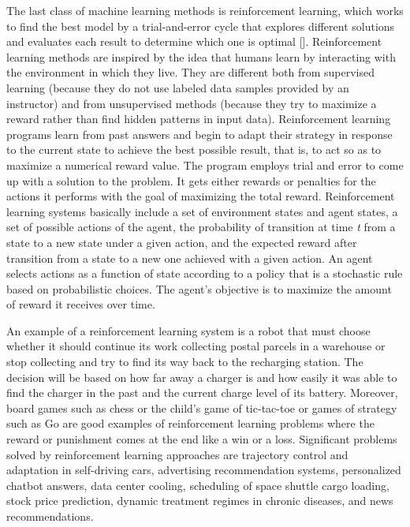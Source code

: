 The last class of machine learning methods is reinforcement learning, which works to find the best model by a trial-and-error cycle that explores different solutions and evaluates each result to determine which one is optimal [\citealt{chap:4:BartoandSutton:2014}]. Reinforcement learning methods are inspired by the idea that humans learn by interacting with the environment in which they live. They are different both from supervised learning (because they do not use labeled data samples provided by an instructor) and from unsupervised methods (because they try to maximize a reward rather than find hidden patterns in input data). Reinforcement learning programs learn from past answers and begin to adapt their strategy in response to the current state to achieve the best possible result, that is, to act so as to maximize a numerical reward value. The program employs trial and error to come up with a solution to the problem. It gets either rewards or penalties for the actions it performs with the goal of maximizing the total reward. Reinforcement learning systems basically include a set of environment states and agent states, a set of possible actions of the agent, the probability of transition at time \textit{t} from a state to a new state under a given action, and the expected reward after transition from a state to a new one achieved with a given action. An agent selects actions as a function of state according to a policy that is a stochastic rule based on probabilistic choices. The agent's objective is to maximize the amount of reward it receives over time.

An example of a reinforcement learning system is a robot that must choose whether it should continue its work collecting postal parcels in a warehouse or stop collecting and try to find its way back to the recharging station. The decision will be based on how far away a charger is and how easily it was able to find the charger in the past and the current charge level of its battery. Moreover, board games such as chess or the child's game of tic-tac-toe or games of strategy such as Go are good examples of reinforcement learning problems where the reward or punishment comes at the end like a win or a loss. Significant problems solved by reinforcement learning approaches are trajectory control and adaptation in self-driving cars, advertising recommendation systems, personalized chatbot answers, data center cooling, scheduling of space shuttle cargo loading, stock price prediction, dynamic treatment regimes in chronic diseases, and news recommendations.

